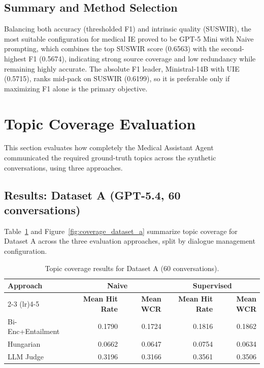 \subsection{Summary and Method Selection}

Balancing both accuracy (thresholded F1) and intrinsic quality (SUSWIR), the most suitable configuration for medical IE proved to be GPT-5 Mini with Naive prompting, which combines the top SUSWIR score (0.6563) with the second-highest F1 (0.5674), indicating strong source coverage and low redundancy while remaining highly accurate.
The absolute F1 leader, Ministral-14B with UIE (0.5715), ranks mid-pack on SUSWIR (0.6199), so it is preferable only if maximizing F1 alone is the primary objective.

\section{Topic Coverage Evaluation}

This section evaluates how completely the Medical Assistant Agent communicated the required ground-truth topics across the synthetic conversations, using three approaches.

\subsection{Results: Dataset A (GPT-5.4, 60 conversations)}

Table~\ref{tab:coverage_dataset_a} and Figure~\ref{fig:coverage_dataset_a} summarize topic coverage for Dataset A across the three evaluation approaches, split by dialogue management configuration.

\begin{table}[htbp]
	\centering
	\caption{Topic coverage results for Dataset A (60 conversations).}
	\label{tab:coverage_dataset_a}
	\begin{tabular}{lrrrr}
		\toprule
		\textbf{Approach} & \multicolumn{2}{c}{\textbf{Naive}} & \multicolumn{2}{c}{\textbf{Supervised}} \\
		\cmidrule(lr){2-3} \cmidrule(lr){4-5}
		& \textbf{Mean Hit Rate} & \textbf{Mean WCR} & \textbf{Mean Hit Rate} & \textbf{Mean WCR} \\
		\midrule
		Bi-Enc+Entailment & 0.1790 & 0.1724 & 0.1816 & 0.1862 \\
		Hungarian         & 0.0662 & 0.0647 & 0.0754 & 0.0634 \\
		LLM Judge         & 0.3196 & 0.3166 & 0.3561 & 0.3506 \\
		\bottomrule
	\end{tabular}
\end{table}

